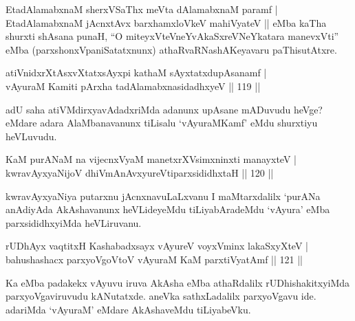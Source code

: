 \begin{artha}
EtadAlamabxnaM sherxVSaThx meVta dAlamabxnaM paramf | EtadAlamabxnaM jAcnxtAvx barxhamxloVkeV mahiVyateV || eMba kaTha shurxti shAsana punaH, ``O miteyxVteVneYvAkaSxreVNeYkatara manevxVti'' eMba (parxshonxVpaniSatatxnunx) athaRvaRNashAKeyavaru paThisutAtxre.
\end{artha}


\begin{shl}
atiVnidxrXtAsxvXtatxsAyxpi kathaM sAyxtatxdupAsanamf   | \\
vAyuraM Kamiti pArxha tadAlamabxnasidadhxyeV \hfill||  119 ||  
\end{shl}

\begin{artha}
adU saha atiVMdirxyavAdadxriMda adanunx upAsane mADuvudu heVge? eMdare adara AlaMbanavanunx tiLisalu `vAyuraMKamf' eMdu shurxtiyu heVLuvudu.
\end{artha}


\begin{shl}
KaM purANaM na vijecnxVyaM manetxrXV\s simxninxti manayxteV  | \\
kwravAyxyaNijoV dhiVmAnAvxyureVtiparxsididhxtaH \hfill||  120 ||  
\end{shl}

\begin{artha}
kwravAyxyaNiya putarxnu jAcnxnavuLaLxvanu I maMtarxdalilx `purANa anAdiyAda AkAshavanunx heVLideyeMdu tiLiyabAradeMdu `vAyura' eMba parxsididhxyiMda heVLiruvanu.
\end{artha}


\begin{shl}
rUDhAyx vaqtitxH Kashabadxsayx vAyureV voyxVminx lakaSxyXteV  | \\
bahushashacx parxyoVgoV\s toV vAyuraM KaM parxtiVyatAmf \hfill||  121 ||  
\end{shl}

\begin{artha}
Ka eMba padakekx vAyuvu iruva AkAsha eMba athaRdalilx rUDhishakitxyiMda parxyoVgaviruvudu kANutatxde. aneVka sathxLadalilx parxyoVgavu ide. adariMda `vAyuraM' eMdare AkAshaveMdu tiLiyabeVku.
\end{artha}


